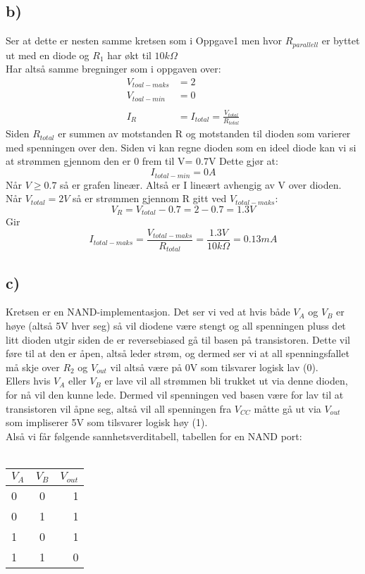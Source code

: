 \documentclass[a4paper, norsk, twoside, 10pt]{article}
\begin{document}
\subsection*{b)}
Ser at dette er nesten samme kretsen som i Oppgave1 men hvor $R_{parallell}$ er byttet ut med en diode og $R_{1}$ har økt til $10k \Omega$\\
Har altså samme bregninger som i oppgaven over:
\begin{align*}
  V_{toal-maks} &= 2\\
  V_{toal-min} &= 0\\
  \\
  I_{R} &= I_{total} = \frac{V_{total}}{R_{total}}
\end{align*}
Siden $R_{total}$ er summen av motstanden R og motstanden til dioden som varierer med spenningen over den. Siden vi kan regne dioden som en ideel diode kan vi si at strømmen gjennom den er 0 frem til V= 0.7V Dette gjør at:
\[I_{total-min} = 0A \]
Når $V \geq 0.7$ så er grafen lineær. Altså er I lineært avhengig av V over dioden. Når $V_{total} = 2V$ så er strømmen gjennom R gitt ved $V_{total-maks}$:
\[V_{R} = V_{total} - 0.7 = 2-0.7 = 1.3V\]
Gir
\[I_{total-maks} =  \frac{V_{total-maks}}{R_{total}} = \frac{1.3 V}{10k \Omega} = 0.13mA\]





\subsection*{c)}

Kretsen er en NAND-implementasjon. Det ser vi ved at hvis både $V_A$ og $V_B$ er høye (altså 5V hver seg) så vil diodene være stengt og all spenningen pluss det litt dioden utgir siden de er reversebiased gå til basen på transistoren. Dette vil føre til at den er åpen, altså leder strøm, og dermed ser vi at all spenningsfallet må skje over $R_2$ og $V_{out}$ vil altså være på 0V som tilsvarer logisk lav (0).\\
Ellers hvis $V_A$ eller $V_B$ er lave vil all strømmen bli trukket ut via denne dioden, for nå vil den kunne lede. Dermed vil spenningen ved basen være for lav til at transistoren vil åpne seg, altså vil all spenningen fra $V_{CC}$ måtte gå ut via $V_{out}$ som impliserer 5V som tilsvarer logisk høy (1). \\
Alså vi får følgende sannhetsverditabell, tabellen for en NAND port:
\\
\\
\begin{tabular}{|l|c||r|}
  \hline
  $V_A$ & $V_B$ & $V_{out}$ \\
  \hline
  0 & 0 & 1 \\
  0 & 1 & 1 \\
  1 & 0 & 1 \\
  1 & 1 & 0 \\
  \hline
\end{tabular}
  
\end{document}
